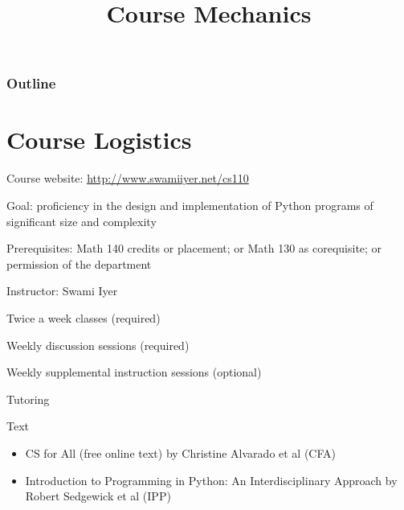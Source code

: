 \documentclass[8pt,a4paper,compress]{beamer}
\title{Course Mechanics}
\date{}
\begin{document}
\begin{frame}
\vfill
\titlepage
\end{frame}

\begin{frame}
\frametitle{Outline}
\tableofcontents
\end{frame}

\section{Course Logistics}
\begin{frame}[fragile]
\pause

Course website: \href{http://www.swamiiyer.net/cs110}{http://www.swamiiyer.net/cs110}

\pause
\bigskip

Goal: proficiency in the design and implementation of Python programs of significant size and complexity

\pause
\bigskip

Prerequisites: Math 140 credits or placement; or Math 130 as corequisite; or permission of the department

\pause
\bigskip

Instructor: Swami Iyer

\pause
\bigskip

Twice a week classes (required)

\pause
\bigskip

Weekly discussion sessions (required)

\pause
\bigskip

Weekly supplemental instruction sessions (optional)

\pause
\bigskip

Tutoring

\pause
\bigskip

Text
\begin{itemize}
\item CS for All (free online text) by Christine Alvarado et al (CFA)
\item Introduction to Programming in Python: An Interdisciplinary Approach by Robert Sedgewick et al (IPP)
\end{itemize}
\end{frame}
\end{document}
